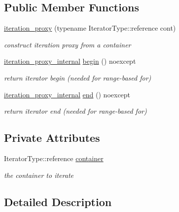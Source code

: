 \subsection*{Public Member Functions}
\begin{DoxyCompactItemize}
\item 
\hyperlink{classnlohmann_1_1basic__json_1_1iteration__proxy_af698dda4c921ee4a56ce9235310ca29c}{iteration\+\_\+proxy} (typename Iterator\+Type\+::reference cont)
\begin{DoxyCompactList}\small\item\em construct iteration proxy from a container \end{DoxyCompactList}\item 
\hyperlink{classnlohmann_1_1basic__json_1_1iteration__proxy_1_1iteration__proxy__internal}{iteration\+\_\+proxy\+\_\+internal} \hyperlink{classnlohmann_1_1basic__json_1_1iteration__proxy_a98cb29b336b99768602f73883a9e4dff}{begin} () noexcept
\begin{DoxyCompactList}\small\item\em return iterator begin (needed for range-\/based for) \end{DoxyCompactList}\item 
\hyperlink{classnlohmann_1_1basic__json_1_1iteration__proxy_1_1iteration__proxy__internal}{iteration\+\_\+proxy\+\_\+internal} \hyperlink{classnlohmann_1_1basic__json_1_1iteration__proxy_a96373fd95d730d50c78974cf7fa8c3a8}{end} () noexcept
\begin{DoxyCompactList}\small\item\em return iterator end (needed for range-\/based for) \end{DoxyCompactList}\end{DoxyCompactItemize}
\subsection*{Private Attributes}
\begin{DoxyCompactItemize}
\item 
Iterator\+Type\+::reference \hyperlink{classnlohmann_1_1basic__json_1_1iteration__proxy_acedcb3422746ac0672d359407a1be56c}{container}
\begin{DoxyCompactList}\small\item\em the container to iterate \end{DoxyCompactList}\end{DoxyCompactItemize}


\subsection{Detailed Description}
